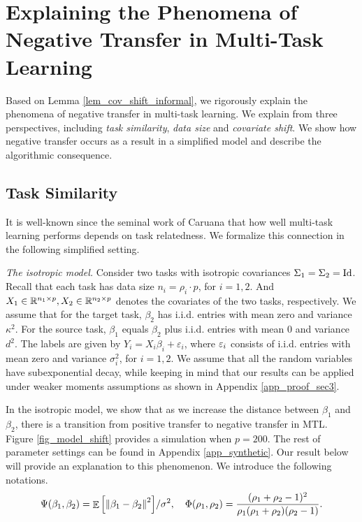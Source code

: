 \section{Explaining the Phenomena of Negative Transfer in Multi-Task Learning}\label{sec_insight}

Based on Lemma \ref{lem_cov_shift_informal}, we rigorously explain the phenomena of negative transfer in multi-task learning.
We explain from three perspectives, including \textit{task similarity}, \textit{data size} and \textit{covariate shift}.
We show how negative transfer occurs as a result in a simplified model and describe the algorithmic consequence.

\subsection{Task Similarity}\label{sec_similarity}

It is well-known since the seminal work of Caruana \cite{C97} that how well multi-task learning performs depends on task relatedness.
We formalize this connection in the following simplified setting.

\textit{The isotropic model.}
	Consider two tasks with isotropic covariances $\Sigma_1 = \Sigma_2 = \operatorname{Id}$.
	Recall that each task has data size $n_i = \rho_i \cdot p$, for $i = 1, 2$.
	And $X_1\in\mathbb{R}^{n_1\times p}, X_2\in\mathbb{R}^{n_2\times p}$ denotes the covariates of the two tasks, respectively.
	We assume that for the target task, $\beta_2$ has i.i.d. entries with mean zero and variance $\kappa^2$.
	For the source task, $\beta_1 $ equals $\beta_2$ plus i.i.d. entries with mean $0$ and variance $d^2$.
	The labels are given by $Y_i = X_i\beta_i + \varepsilon_i$, where ${\varepsilon}_i$ consists of i.i.d. entries with mean zero and variance $\sigma_i^2$, for $i=1,2$.
	We assume that all the random variables have subexponential decay, while keeping in mind that our results can be applied under weaker moments assumptions as shown in Appendix \ref{app_proof_sec3}.

In the isotropic model, we show that as we increase the distance between $\beta_1$ and $\beta_2$, there is a transition from positive transfer to negative transfer in MTL.
Figure \ref{fig_model_shift} provides a simulation when $p = 200$.
{The rest of parameter settings can be found in Appendix \ref{app_synthetic}.}
Our result below will provide an explanation to this phenomenon.
We introduce the following notations.
\begin{align*}
	\Psi(\beta_1, \beta_2) = {\mathop{\mathbb{E}}\left[ \left\| \beta_1 - \beta_2 \right\|^2 \right]} / {\sigma^2},  \quad \Phi(\rho_1, \rho_2) = \frac{(\rho_1 + \rho_2 - 1)^2}{\rho_1 (\rho_1 + \rho_2) (\rho_2 - 1)}.
\end{align*}

